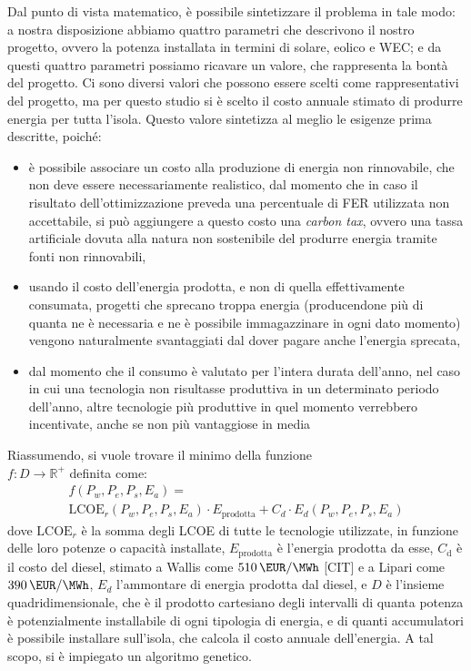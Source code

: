 \documentclass[fleqn,11pt]{SelfArx} %
\begin{document}
Dal punto di vista matematico, è possibile sintetizzare il problema in tale modo: a nostra disposizione abbiamo quattro parametri che descrivono il nostro progetto, ovvero la potenza installata in termini di solare, eolico e WEC; e da questi quattro parametri possiamo ricavare un valore, che rappresenta la bontà del progetto.
Ci sono diversi valori che possono essere scelti come rappresentativi del progetto, ma per questo studio si è scelto il costo annuale stimato di produrre energia per tutta l'isola.
Questo valore sintetizza al meglio le esigenze prima descritte, poiché:
\begin{itemize}
	\item è possibile associare un costo alla produzione di energia non rinnovabile, che non deve essere necessariamente realistico, dal momento che in caso il risultato dell'ottimizzazione preveda una percentuale di FER utilizzata non accettabile, si può aggiungere a questo costo una \textit{carbon tax}, ovvero una tassa artificiale dovuta alla natura non sostenibile del produrre energia tramite fonti non rinnovabili,
	\item usando il costo dell'energia prodotta, e non di quella effettivamente consumata, progetti che sprecano troppa energia (producendone più di quanta ne è necessaria e ne è possibile immagazzinare in ogni dato momento) vengono naturalmente svantaggiati dal dover pagare anche l'energia sprecata,
	\item dal momento che il consumo è valutato per l'intera durata dell'anno, nel caso in cui una tecnologia non risultasse produttiva in un determinato periodo dell'anno, altre tecnologie più produttive in quel momento verrebbero incentivate, anche se non più vantaggiose in media
\end{itemize}
Riassumendo, si vuole trovare il minimo della funzione \\ $f: D \to \mathbb{R}^+$ definita come:
\begin{equation}
	\begin{array}{cl}
		f (P_w, P_e, P_s, E_a) = \\
		\text{LCOE}_r(P_w, P_e, P_s, E_a) \cdot E_\text{prodotta} + C_d \cdot E_d(P_w, P_e, P_s, E_a)
	\end{array}
\end{equation}
dove $\text{LCOE}_r$ è la somma degli LCOE di tutte le tecnologie utilizzate, in funzione delle loro potenze o capacità installate, $E_\text{prodotta}$ è l'energia prodotta da esse, $C_\text{d}$ è il costo del diesel, stimato a Wallis come $\SI{510}{\EUR\per\MWh}$ [CIT] e a Lipari come $\SI{390}{\EUR\per\MWh}$, $E_d$ l'ammontare di energia prodotta dal diesel, e $D$ è l'insieme quadridimensionale, che è il prodotto cartesiano degli intervalli di quanta potenza è potenzialmente installabile di ogni tipologia di energia, e di quanti accumulatori è possibile installare sull'isola, che calcola il costo annuale dell'energia.
A tal scopo, si è impiegato un algoritmo genetico.
\end{document}
